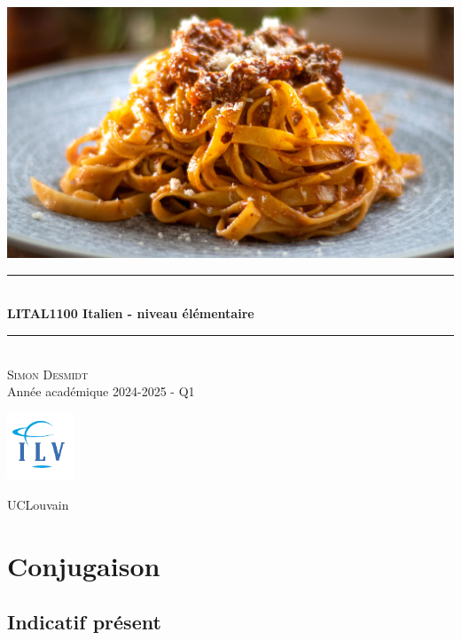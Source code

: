\documentclass[12pt, openany]{report}
\newcommand{\HRule}{\rule{\linewidth}{0.5mm}}
\begin{document}
\begin{titlepage}
    \begin{sffamily}
    \begin{center}
        \includegraphics[scale=0.25]{img/page_de_garde.png} \\[1cm]
        \HRule \\[0.4cm]
        { \huge \bfseries LITAL1100 Italien - niveau élémentaire \\[0.4cm] }
    
        \HRule \\[1.5cm]
        \textsc{\LARGE Simon Desmidt}\\[1cm]
        \vfill
        \vspace{2cm}
        {\large Année académique 2024-2025 - Q1}
        \vspace{0.4cm}
         
        \includegraphics[width=0.15\textwidth]{img/ilv.png}
        
        UCLouvain\\
    
    \end{center}
    \end{sffamily}
\end{titlepage}

\setcounter{tocdepth}{1}
\tableofcontents
\chapter{Conjugaison}
\section{Indicatif présent}
\end{document}
